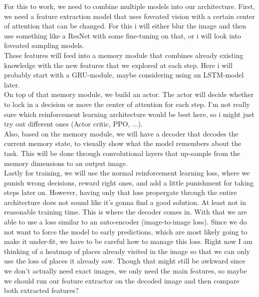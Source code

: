 \documentclass[12pt,a4paper]{article}
\begin{document}
For this to work, we need to combine multiple models into our architecture.
First, we need a feature extraction model that uses foveated vision with a certain center of attention that can be changed. For this i will either blur the image and then use something like a ResNet with some fine-tuning on that, or i will look into foveated sampling models. \\
These features will feed into a memory module that combines already existing knowledge with the new features that we explored at each step. Here i will probably start with a GRU-module, maybe considering using an LSTM-model later.\\
On top of that memory module, we build an actor. The actor will decide whether to lock in a decision or move the center of attention for each step. I'm not really sure which reinforcement learning architecture would be best here, so i might just try out different ones (Actor critic, PPO, ...).\\
Also, based on the memory module, we will have a decoder that decodes the current memory state, to visually show what the model remembers about the task. This will be done through convolutional layers that up-sample from the memory dimensions to an output image.\\
Lastly for training, we will use the normal reinforcement learning loss, where we punish wrong decisions, reward right ones, and add a little punishment for taking steps later on. However, having only that loss propergate through the entire architecture does not sound like it's gonna find a good solution. At least not in reasonable training time. This is where the decoder comes in. With that we are able to use a loss similar to an auto-encoder (image-to-image loss). Since we do not want to force the model to early predictions, which are most likely going to make it under-fit, we have to be careful how to manage this loss. Right now I am thinking of a heatmap of places already visited in the image so that we can only use the loss of places it already saw. Though that might still be awkward since we don't actually need exact images, we only need the main features, so maybe we should run our feature extractor on the decoded image and then compare both extracted features?\\
\end{document}
